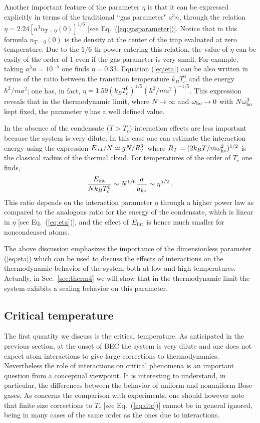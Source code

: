 Another important feature of the parameter $\eta$ is that it can
be expressed explicitly in terms of the traditional ``gas parameter"
$a^3n$, through the relation $\eta =2.24 [a^3 n_{T=0}(0)]^{1/6}$
[see Eq.~(\ref{eq:gasparameter})]. Notice that in this formula
$n_{T=0}(0)$ is the density at  the center of the trap evaluated at
zero temperature. Due to the $1/6$-th power entering this relation,
the value of $\eta$  can be easily of the order of $1$ even if the
gas parameter is very small. For example, taking $a^3n = 10^{-5}$ one 
finds $\eta=0.33$. Equation (\ref{eq:eta})  can be also written in 
terms of the ratio between the transition temperature $k_BT_c^0$ and 
the energy  $\hbar^2/ma^2$; one has, in fact, $\eta=1.59 (k_BT_c^0)^{1/5}
(\hbar^2/ma^2)^{-1/5}$. This  expression reveals that in the 
thermodynamic  limit, where $N\to\infty$ and $\omega_{\rm ho}\to 0$ 
with $N\omega_{\rm ho}^3$ kept fixed, the parameter $\eta$ has a 
well defined value.

In the absence of the condensate ($T>T_c$) interaction effects
are less important  because the system is
very dilute. In this case one can  estimate the interaction energy
using the expression $E_{\rm int}/N\simeq gN/R^3_T$ where $R_T =(2k_BT/m
\omega_{\rm ho}^2)^{1/2}$ is the classical radius  of the thermal cloud.  
For temperatures of the order of $T_c$ one finds,
\begin{equation}
\frac{E_{\rm int}}{N k_BT_c^0} \sim N^{1/6}
\frac{a}{a_{\rm ho}} \sim \eta^{5/2} \; .
\label{eq:ratNT}
\end{equation}
This ratio depends on the interaction parameter $\eta$ through a higher
power law as compared to the analogous ratio for the energy of the
condensate, which is linear in $\eta$ [see Eq.~(\ref{eq:eta})], and 
the effect of $E_{\rm int}$ is hence much smaller for noncondensed atoms.

The above discussion emphasizes the importance of the dimensionless
parameter (\ref{eq:eta}) which can be used to discuss the effects of
interactions on the thermodynamic behavior of the system both at low
and high temperatures. Actually, in Sec.~\ref{sec:therm4} we will
show  that  in the thermodynamic limit the  system exhibits a scaling
behavior on this parameter. 

\subsection{Critical temperature}
\label{sec:therm2}

The first quantity we discuss is the critical temperature. As anticipated 
in the previous section, at the onset of BEC the system is very dilute 
and one does not expect atom interactions to give large corrections 
to thermodynamics.
Nevertheless the role of interactions on critical phenomena is an
important question from a conceptual viewpoint. It is interesting to
understand, in particular, the differences between the behavior of
uniform and nonuniform Bose gases. As concerns the comparison with
experiments, one should however note that finite size corrections to
$T_c$ [see Eq.~(\ref{eq:dtc})] cannot be in general ignored,
being in many cases of the same order as the ones due to interactions.

